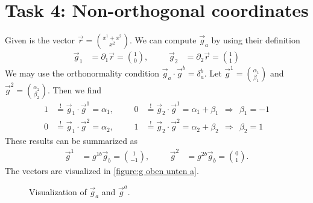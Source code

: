 \documentclass[english, parskip=full]{scrartcl}
\title{\titel}
\author{\autor}
\date{\today}
\begin{document}
\maketitle  %


\section*{Task 4: Non-orthogonal coordinates}
Given is the vector $\vec{r}=\binom{x^1+x^2}{x^2}$.
We can compute $\vec{g}_a$ by using their definition
\begin{align}
\vec{g}_1 &= \partial_1\vec{r} = \binom{1}{0},&& &\vec{g}_2 &=\partial_2\vec{r} = \binom{1}{1} \label{eqn:g unten a} 
\end{align}
We may use the orthonormality condition $\vec{g}_a\cdot\vec{g}^b=\delta_a^b$. 
Let $\vec{g}^{1}=\binom{\alpha_{1}}{\beta_{1}}$ and $\vec{g}^{2}=\binom{\alpha_{2}}{\beta_{2}}$.
Then we find
\begin{align}
1 &\overset{!}{=} \vec{g}_1\cdot\vec{g}^1 = \alpha_1, &&& 0&\overset{!}{=}\vec{g}_2\cdot\vec{g}^1 = \alpha_1+\beta_1\ \ \Rightarrow\ \ \beta_1 = -1\\
0 &\overset{!}{=} \vec{g}_1\cdot\vec{g}^2 = \alpha_2, &&& 1&\overset{!}{=}\vec{g}_2\cdot\vec{g}^2 = \alpha_2+\beta_2\ \ \Rightarrow\ \ \beta_2 = 1
\end{align}
These results can be summarized as
\begin{align}
\vec{g}^1 &= g^{1b}\vec{g}_b = \binom{1}{-1},&& &\vec{g}^2 &= g^{2b}\vec{g}_b = \binom{0}{1}\label{eqn:g oben a}.
\end{align}
The vectors are visualized in \autoref{figure:g oben unten a}.
\begin{figure}[h!]
\centering
{}
\caption{Visualization of $\vec{g}_a$ and $\vec{g}^a$.}
\label{figure:g oben unten a}
\end{figure}
\end{document}
